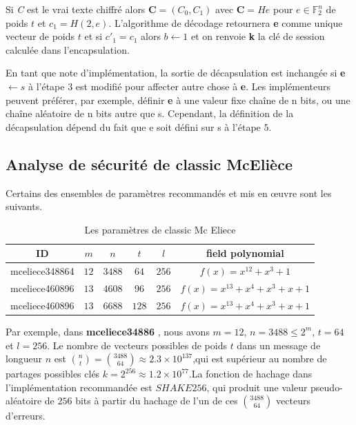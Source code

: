 \documentclass[12pt,openany]{report}
\begin{document}
\begin{tipblock}

Si \textit{C} est le vrai texte chiffré alors \textbf{C}$=(C_0,C_1)$ avec \textbf{C}$=\mathit{H}e$ pour $ e \in \mathbb{F}^n_2 $ de poids $t$ et \textbf{$ c_1$}$=\mathit{H}(2,e)$. L'algorithme de décodage retournera \textbf{e} comme unique vecteur de poids $ t $ et si  \textbf{$c'_1$}$=$\textbf{$c_1$} alors $ b\leftarrow 1 $ et on renvoie \textbf{k} la clé de session calculée dans l'encapsulation.

\end{tipblock}
\begin{noteblock}
En tant que note d'implémentation, la sortie de décapsulation est inchangée si    \textbf{e}$\leftarrow s $ à l'étape $3$
est modifié pour affecter autre chose à \textbf{e}. Les implémenteurs peuvent préférer, par exemple, définir \textbf{e} à une valeur fixe
chaîne de n bits, ou une chaîne aléatoire de n bits autre que s. Cependant, la définition de la décapsulation
dépend du fait que e soit défini sur s à l'étape $ 5 $.

\end{noteblock}



\noindent\hrulefill

\subsection{Analyse de sécurité de classic McElièce}
Certains des ensembles de paramètres recommandés et mis en œuvre sont les suivants.

\begin{table}
\centering
\begin{tabular}{ |c|c|c|c|c|c|}
\hline
ID&$m$ & $n$ & $t$&$l$& field polynomial\\
\hline
mceliece348864 &$12$ &$3488$&$64$&$256$&$ f(x)=x^{12}+x^3+1 $\\
\hline
mceliece460896 &$13$ &$4608$&$96$&$256$&$ f(x)=x^{13}+x^4+x^3+x+1 $\\
\hline
mceliece460896 &$13$ &$6688$&$128$&$256$&$ f(x)=x^{13}+x^4+x^3+x+1 $\\
\hline
\end{tabular}
\caption{Les paramètres de classic Mc Eliece}
\label{mceliece}
\end{table}

Par exemple, dans \textbf{mceliece34886} , nous avons $m = 12$, $n = 3488 \leq 2^m$, $t = 64$ et
$l = 256$. Le nombre de vecteurs possibles de poids $t$ dans un message de longueur $n$ est ${n\choose t}= {3488\choose 64}\approx 2.3 \times 10^{137} $,qui est supérieur au nombre de partages possibles
clés $k = 2^{256} \approx 1.2\times 10^{77}$.La fonction de hachage dans l'implémentation recommandée
est $SHAKE256$, qui produit une valeur pseudo-aléatoire de $256$ bits à partir du hachage de l'un de
ces  $ {3488 \choose 64}$ vecteurs d'erreurs.\\
\end{document}
